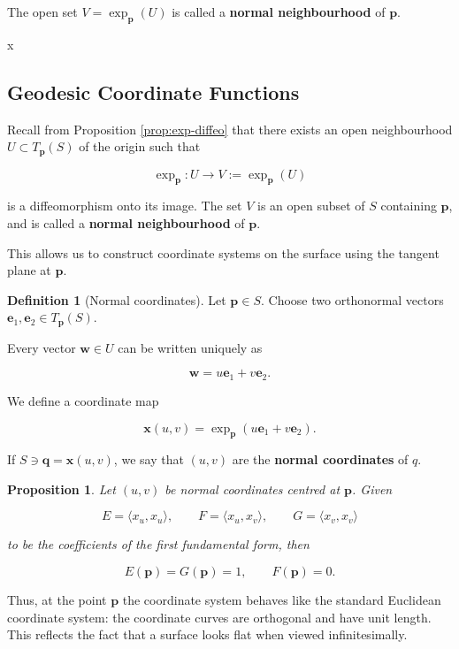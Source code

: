 \documentclass[10pt, a4paper]{article}
\theoremstyle{plain}
\newtheorem{proposition}[theorem]{Proposition}
\theoremstyle{definition}
\newtheorem{definition}[theorem]{Definition}
\theoremstyle{remark}
\newenvironment{sidenote}{%
  \par\vspace{0.5em}%
  \noindent\color{defcolor}%
}{%
  \par\vspace{0.5em}%
  \color{black}%
}
\begin{document}
The open set $V = \exp_\mathbf{p}(U)$ is called a \textbf{normal neighbourhood} of 
$\mathbf{p}$.

x\subsection{Geodesic Coordinate Functions}

Recall from Proposition \ref{prop:exp-diffeo} that there exists an open 
neighbourhood $U \subset T_\mathbf{p}(S)$ of the origin such that

\[
\exp_\mathbf{p} : U \to V := \exp_\mathbf{p}(U)
\]

is a diffeomorphism onto its image. The set $V$ is an open subset of $S$ 
containing $\mathbf{p}$, and is called a \textbf{normal neighbourhood} of 
$\mathbf{p}$.

This allows us to construct coordinate systems on the surface using the 
tangent plane at $\mathbf{p}$.

\begin{definition}[Normal coordinates]
Let $\mathbf{p} \in S$. Choose two orthonormal vectors 
$\mathbf{e}_1, \mathbf{e}_2 \in T_\mathbf{p}(S)$.

Every vector $\mathbf{w} \in U$ can be written uniquely as

\[
\mathbf{w} = u\mathbf{e}_1 + v\mathbf{e}_2 .
\]

We define a coordinate map

\[
\textbf{x}(u,v) = \exp_\mathbf{p}(u\mathbf{e}_1 + v\mathbf{e}_2).
\]

If $S \ni \textbf{q} = \textbf{x}(u,v)$, we say that $(u,v)$ are the \textbf{normal coordinates} of 
$q$.
\end{definition}


\begin{proposition}
Let $(u,v)$ be normal coordinates centred at $\mathbf{p}$. Given

\[
E = \langle x_u, x_u \rangle, 
\qquad
F = \langle x_u, x_v \rangle, 
\qquad
G = \langle x_v, x_v \rangle
\]

to be the coefficients of the first fundamental form, then

\[
E(\mathbf{p}) = G(\mathbf{p}) = 1, 
\qquad
F(\mathbf{p}) = 0 .
\]
\end{proposition}

\begin{sidenote}
Thus, at the point $\mathbf{p}$ the coordinate system behaves like the 
standard Euclidean coordinate system: the coordinate curves are orthogonal 
and have unit length. This reflects the fact that a surface looks flat when 
viewed infinitesimally.
\end{sidenote}
\end{document}
